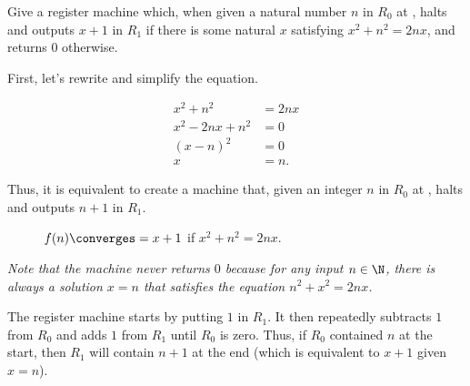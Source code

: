 \begin{problem}
  Give a register machine which, when given a natural number $n$ in
  $R_0$ at , halts and outputs $x + 1$ in $R_1$
  if there is some natural $x$ satisfying $x^2 + n^2 = 2nx$,
  and returns $0$ otherwise.

  \begin{answer}
    First, let's rewrite and simplify the equation.

    \begin{align*}
      x^2 + n^2 &= 2nx \\
      x^2 - 2nx + n^2 &= 0 \\
      (x - n)^2 &= 0 \\
      x &= n.
    \end{align*}

    Thus, it is equivalent to create a machine that,
    given an integer $n$ in $R_0$ at ,
    halts and outputs $n + 1$ in $R_1$.

    \begin{figure}[H]
      \centering
      \caption{$f(n) \converges = x+1$ if $x^2 + n^2 = 2nx$.}
      \label{fig:plus1}
    \end{figure}

    \emph{
      Note that the machine never returns $0$
      because for any input $n \in \N$,
      there is always a solution $x = n$
      that satisfies the equation
      $n^2 + x^2 = 2nx$.
    }

    \step
    The register machine starts by putting $1$ in $R_1$.
    It then repeatedly subtracts $1$ from $R_0$ and
    adds $1$ from $R_1$ until $R_0$ is zero.
    Thus, if $R_0$ contained $n$ at the start,
    then $R_1$ will contain $n + 1$ at the end
    (which is equivalent to $x+1$ given $x = n$).
  \end{answer}
\end{problem}
